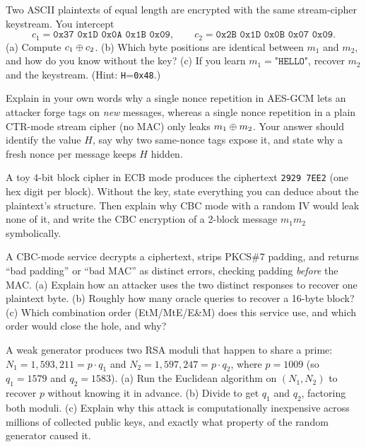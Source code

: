 \begin{exercise}
\label{ch38:ex-crib}
Two ASCII plaintexts of equal length are encrypted with the same stream-cipher keystream. You intercept
\[
c_1 = \texttt{0x37 0x1D 0x0A 0x1B 0x09}, \qquad c_2 = \texttt{0x2B 0x1D 0x0B 0x07 0x09}.
\]
(a) Compute $c_1 \oplus c_2$. (b) Which byte positions are identical between $m_1$ and $m_2$, and how do you know without the key? (c) If you learn $m_1 = \texttt{"HELLO"}$, recover $m_2$ and the keystream. (Hint: \texttt{H}=\texttt{0x48}.)
\end{exercise}

\begin{exercise}
\label{ch38:ex-gcm}
Explain in your own words why a single nonce repetition in AES-GCM lets an attacker forge tags on \emph{new} messages, whereas a single nonce repetition in a plain CTR-mode stream cipher (no MAC) only leaks $m_1 \oplus m_2$. Your answer should identify the value $H$, say why two same-nonce tags expose it, and state why a fresh nonce per message keeps $H$ hidden.
\end{exercise}

\begin{exercise}
\label{ch38:ex-ecb-read}
A toy 4-bit block cipher in ECB mode produces the ciphertext \texttt{2929 7EE2} (one hex digit per block). Without the key, state everything you can deduce about the plaintext's structure. Then explain why CBC mode with a random IV would leak none of it, and write the CBC encryption of a 2-block message $m_1 m_2$ symbolically.
\end{exercise}

\begin{exercise}
\label{ch38:ex-padding}
A CBC-mode service decrypts a ciphertext, strips PKCS\#7 padding, and returns ``bad padding'' or ``bad MAC'' as distinct errors, checking padding \emph{before} the MAC. (a) Explain how an attacker uses the two distinct responses to recover one plaintext byte. (b) Roughly how many oracle queries to recover a 16-byte block? (c) Which combination order (EtM/MtE/E\&M) does this service use, and which order would close the hole, and why?
\end{exercise}

\begin{exercise}
\label{ch38:ex-gcd}
A weak generator produces two RSA moduli that happen to share a prime: $N_1 = 1{,}593{,}211 = p \cdot q_1$ and $N_2 = 1{,}597{,}247 = p \cdot q_2$, where $p = 1009$ (so $q_1 = 1579$ and $q_2 = 1583$). (a) Run the Euclidean algorithm on $(N_1, N_2)$ to recover $p$ without knowing it in advance. (b) Divide to get $q_1$ and $q_2$, factoring both moduli. (c) Explain why this attack is computationally inexpensive across millions of collected public keys, and exactly what property of the random generator caused it.
\end{exercise}


